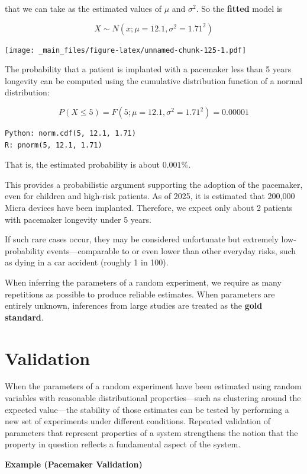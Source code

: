 \documentclass[
]{book}
\begin{document}
that we can take as the estimated values of \(\mu\) and \(\sigma^2\). So the \textbf{fitted} model is

\[X \sim N(x; \mu=12.1, \sigma^2=1.71^2)\]

\texttt{[image: \_main\_files/figure-latex/unnamed-chunk-125-1.pdf]}

The probability that a patient is implanted with a pacemaker less than 5 years longevity can be computed using the cumulative distribution function of a normal distribution:

\[
P(X \leq 5) = F(5; \mu = 12.1, \sigma^2 = 1.71^2) = 0.00001
\]

\begin{verbatim}
Python: norm.cdf(5, 12.1, 1.71)
R: pnorm(5, 12.1, 1.71)
\end{verbatim}

That is, the estimated probability is about \(0.001\%\).

This provides a probabilistic argument supporting the adoption of the pacemaker, even for children and high-risk patients. As of 2025, it is estimated that 200,000 Micra devices have been implanted. Therefore, we expect only about 2 patients with pacemaker longevity under 5 years.

If such rare cases occur, they may be considered unfortunate but extremely low-probability events---comparable to or even lower than other everyday risks, such as dying in a car accident (roughly 1 in 100).

When inferring the parameters of a random experiment, we require as many repetitions as possible to produce reliable estimates. When parameters are entirely unknown, inferences from large studies are treated as the \textbf{gold standard}.

\hypertarget{validation}{%
\section{Validation}\label{validation}}

When the parameters of a random experiment have been estimated using random variables with reasonable distributional properties---such as clustering around the expected value---the stability of those estimates can be tested by performing a new set of experiments under different conditions. Repeated validation of parameters that represent properties of a system strengthens the notion that the property in question reflects a fundamental aspect of the system.

\textbf{Example (Pacemaker Validation)}
\end{document}
